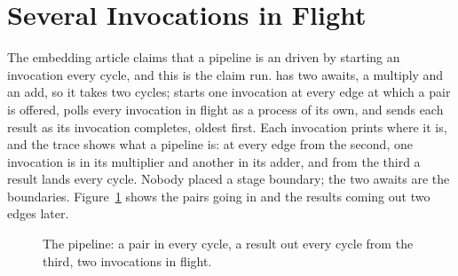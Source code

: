 \section{Several Invocations in Flight}
\label{sec:x-inflight}

The embedding article claims that a pipeline is an 
driven by starting an invocation every cycle, and this is the claim
run.  has two awaits, a multiply and an add, so it takes two
cycles;  starts one invocation at every edge at
which a pair is offered, polls every invocation in flight as a process
of its own, and sends each result as its invocation completes, oldest
first. Each invocation prints where it is, and the trace shows what a
pipeline is: at every edge from the second, one invocation is in its
multiplier and another in its adder, and from the third a result lands
every cycle. Nobody placed a stage boundary; the two awaits are the
boundaries. Figure~\ref{fig:x-inflight} shows the pairs going in and
the results coming out two edges later.

\begin{figure}[htbp]
\centering

\caption{The pipeline: a pair in every cycle, a result out every cycle from the third, two invocations in flight.}
\label{fig:x-inflight}
\end{figure}




